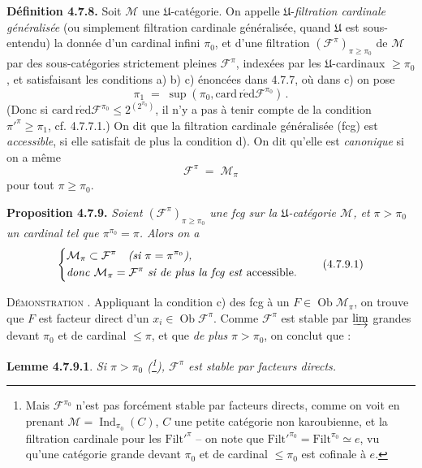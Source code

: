 \documentclass[11pt]{article}
\newcommand{\printedpage}[1]{\marginpar{\footnotesize p.~#1}}
\newcommand{\msp}[1]{\marginpar{\footnotesize [#1]}}
\newcommand{\Ob}{\operatorname{Ob}}
\newcommand{\Filt}{\mathrm{Filt}}
\newcommand{\Ind}{\operatorname{Ind}}
\newcommand{\cardred}{\operatorname{card\,r\acute{e}d}}
\begin{document}
\textbf{Définition 4.7.8.} Soit $\mathcal{M}$ une $\mathfrak{U}$-catégorie. On appelle $\mathfrak{U}$-\textit{filtration cardinale généralisée} (ou simplement filtration cardinale généralisée, quand $\mathfrak{U}$ est sous-entendu) la donnée d'un cardinal infini $\pi_0$, et d'une filtration $(\mathcal{F}^{\pi})_{\pi\geqslant\pi_0}$ de $\mathcal{M}$ par des sous-catégories strictement pleines $\mathcal{F}^{\pi}$, indexées par les $\mathfrak{U}$-cardinaux $\geqslant\pi_0$, et satisfaisant les conditions a) b) c) énoncées dans 4.7.7, où dans c) on pose
\[
\pi_1 \;=\; \sup(\pi_0,\cardred\mathcal{F}^{\pi_0}) \, . \tag*{(4.7.8.1)}
\]
(Donc si $\cardred\mathcal{F}^{\pi_0}\leqslant 2^{(2^{\pi_0})}$, il n'y a pas à tenir compte de la condition $\pi'^{\pi}\geqslant\pi_1$, cf. 4.7.7.1.) On dit que la filtration cardinale généralisée (fcg) est \textit{accessible}, si elle satisfait de plus la condition d). On dit qu'elle est \textit{canonique} si on a même
\[
\mathcal{F}^{\pi} \;=\; \mathcal{M}_{\pi} \tag*{(4.7.8.2)}
\]
pour tout $\pi\geqslant\pi_0$.

\textbf{Proposition 4.7.9.} \textit{Soient $(\mathcal{F}^{\pi})_{\pi\geqslant\pi_0}$ une fcg sur la $\mathfrak{U}$-catégorie $\mathcal{M}$, et $\pi>\pi_0$ un cardinal tel que $\pi^{\pi_0}=\pi$. Alors on a}
\printedpage{60}
\msp{page 177}
\[
\left\{
\begin{aligned}
&\mathcal{M}_\pi\subset\mathcal{F}^{\pi}\quad\text{\textit{(si $\pi=\pi^{\pi_0}$),}}\\
&\text{\textit{donc} }\mathcal{M}_\pi=\mathcal{F}^{\pi}\text{ \textit{si de plus la fcg est} accessible.}
\end{aligned}
\right.
\tag*{(4.7.9.1)}
\]

\textsc{Démonstration} . Appliquant la condition c) des fcg à un $F\in\Ob\mathcal{M}_\pi$, on trouve que $F$ est facteur direct d'un $x_i\in\Ob\mathcal{F}^{\pi}$. Comme $\mathcal{F}^{\pi}$ est stable par $\varinjlim$ grandes devant $\pi_0$ et de cardinal $\leqslant\pi$, et que \textit{de plus} $\pi>\pi_0$, on conclut que :

\textbf{Lemme 4.7.9.1}. \textit{Si $\pi>\pi_0$ (\footnote[76]{Mais $\mathcal{F}^{\pi_0}$ n'est pas forcément stable par facteurs directs, comme on voit en prenant $\mathcal{M}=\Ind_{\pi_0}(C)$, $C$ une petite catégorie non karoubienne, et la filtration cardinale pour les $\Filt'^{\pi}$ -- on note que $\Filt'^{\pi_0}=\Filt^{\pi_0}\simeq e$, vu qu'une catégorie grande devant $\pi_0$ et de cardinal $\leqslant\pi_0$ est cofinale à $e$.}), $\mathcal{F}^{\pi}$ est stable par facteurs directs.}
\end{document}
